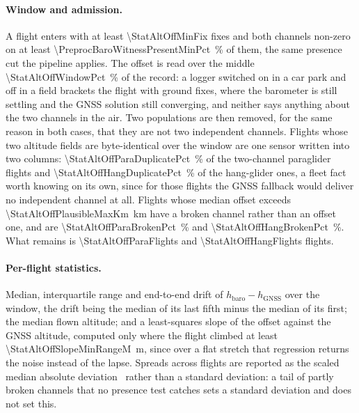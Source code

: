\begin{revblock}
\paragraph{Window and admission.} A flight enters with at least \num{\StatAltOffMinFix} fixes and both
channels non-zero on at least \SI{\PreprocBaroWitnessPresentMinPct}{\percent} of them, the same
presence cut the pipeline applies. The offset is read over the middle \SI{\StatAltOffWindowPct}{\percent}
of the record: a logger switched on in a car park and off in a field brackets the flight
with ground fixes, where the barometer is still settling and the GNSS solution still
converging, and neither says anything about the two channels in the air. Two populations
are then removed, for the same reason in both cases, that they are not two independent
channels. Flights whose two altitude fields are byte-identical over the window are one
sensor written into two columns: \SI{\StatAltOffParaDuplicatePct}{\percent} of the
two-channel paraglider flights and \SI{\StatAltOffHangDuplicatePct}{\percent} of the
hang-glider ones, a fleet fact worth knowing on its own, since for those flights the
GNSS fallback would deliver no independent channel at all. Flights whose median offset
exceeds \SI{\StatAltOffPlausibleMaxKm}{\kilo\metre} have a broken channel rather than an offset one, and are
\SI{\StatAltOffParaBrokenPct}{\percent} and \SI{\StatAltOffHangBrokenPct}{\percent}.
What remains is \num{\StatAltOffParaFlights} and \num{\StatAltOffHangFlights} flights.

\paragraph{Per-flight statistics.} Median, interquartile range and end-to-end drift of
$h_{\mathrm{baro}}-h_{\mathrm{GNSS}}$ over the window, the drift being the median of its
last fifth minus the median of its first; the median flown altitude; and a least-squares
slope of the offset against the GNSS altitude, computed only where the flight climbed
at least \SI{\StatAltOffSlopeMinRangeM}{\metre}, since over a flat stretch that
regression returns the noise
instead of the lapse. Spreads across flights are reported as the scaled median absolute
deviation~\cite{rousseeuw1993} rather than a standard deviation: a tail of partly broken
channels that no presence test catches sets a standard deviation and does not set this.


\end{revblock}
